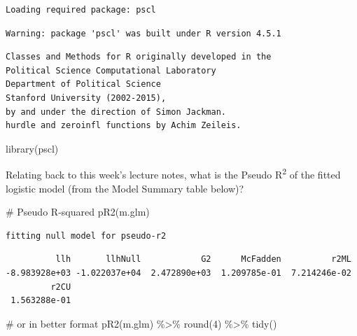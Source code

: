 \documentclass[
  letterpaper,
  DIV=11,
  numbers=noendperiod]{scrreprt}
\newenvironment{Shaded}{\begin{snugshade}}{\end{snugshade}}
\newcommand{\CommentTok}[1]{\textcolor[rgb]{0.37,0.37,0.37}{#1}}
\newcommand{\DecValTok}[1]{\textcolor[rgb]{0.68,0.00,0.00}{#1}}
\newcommand{\FunctionTok}[1]{\textcolor[rgb]{0.28,0.35,0.67}{#1}}
\newcommand{\NormalTok}[1]{\textcolor[rgb]{0.00,0.23,0.31}{#1}}
\newcommand{\SpecialCharTok}[1]{\textcolor[rgb]{0.37,0.37,0.37}{#1}}
\begin{document}
\begin{verbatim}
Loading required package: pscl
\end{verbatim}

\begin{verbatim}
Warning: package 'pscl' was built under R version 4.5.1
\end{verbatim}

\begin{verbatim}
Classes and Methods for R originally developed in the
Political Science Computational Laboratory
Department of Political Science
Stanford University (2002-2015),
by and under the direction of Simon Jackman.
hurdle and zeroinfl functions by Achim Zeileis.
\end{verbatim}

\begin{Shaded}
\begin{Highlighting}[]
\FunctionTok{library}\NormalTok{(pscl)}
\end{Highlighting}
\end{Shaded}

Relating back to this week's lecture notes, what is the Pseudo
R\textsuperscript{2} of the fitted logistic model (from the Model
Summary table below)?

\begin{Shaded}
\begin{Highlighting}[]
\CommentTok{\# Pseudo R{-}squared}
\FunctionTok{pR2}\NormalTok{(m.glm)}
\end{Highlighting}
\end{Shaded}

\begin{verbatim}
fitting null model for pseudo-r2
\end{verbatim}

\begin{verbatim}
          llh       llhNull            G2      McFadden          r2ML 
-8.983928e+03 -1.022037e+04  2.472890e+03  1.209785e-01  7.214246e-02 
         r2CU 
 1.563288e-01 
\end{verbatim}

\begin{Shaded}
\begin{Highlighting}[]
\CommentTok{\# or in better format}
\FunctionTok{pR2}\NormalTok{(m.glm) }\SpecialCharTok{\%\textgreater{}\%} \FunctionTok{round}\NormalTok{(}\DecValTok{4}\NormalTok{) }\SpecialCharTok{\%\textgreater{}\%} \FunctionTok{tidy}\NormalTok{()}
\end{Highlighting}
\end{Shaded}
\end{document}
